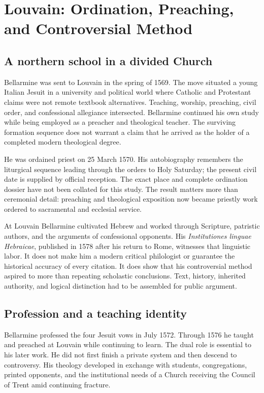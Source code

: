 \section{Louvain: Ordination, Preaching, and Controversial Method}

\subsection{A northern school in a divided Church}

Bellarmine was sent to Louvain in the spring of 1569.  The move situated a
young Italian Jesuit in a university and political world where Catholic and
Protestant claims were not remote textbook alternatives.  Teaching, worship,
preaching, civil order, and confessional allegiance intersected.  Bellarmine
continued his own study while being employed as a preacher and theological
teacher.  The surviving formation sequence does not warrant a claim that he
arrived as the holder of a completed modern theological degree.

He was ordained priest on 25 March 1570.  His autobiography remembers the
liturgical sequence leading through the orders to Holy Saturday; the present
civil date is supplied by official reception.  The exact place and complete
ordination dossier have not been collated for this study.  The result matters
more than ceremonial detail: preaching and theological exposition now became
priestly work ordered to sacramental and ecclesial service.

At Louvain Bellarmine cultivated Hebrew and worked through Scripture, patristic
authors, and the arguments of confessional opponents.  His
\emph{Institutiones linguae Hebraicae}, published in 1578 after his return to
Rome, witnesses that linguistic labor.  It does not make him a modern critical
philologist or guarantee the historical accuracy of every citation.  It does
show that his controversial method aspired to more than repeating scholastic
conclusions.  Text, history, inherited authority, and logical distinction had
to be assembled for public argument.

\subsection{Profession and a teaching identity}

Bellarmine professed the four Jesuit vows in July 1572.  Through 1576 he taught
and preached at Louvain while continuing to learn.  The dual role is essential
to his later work.  He did not first finish a private system and then descend
to controversy.  His theology developed in exchange with students,
congregations, printed opponents, and the institutional needs of a Church
receiving the Council of Trent amid continuing fracture.

